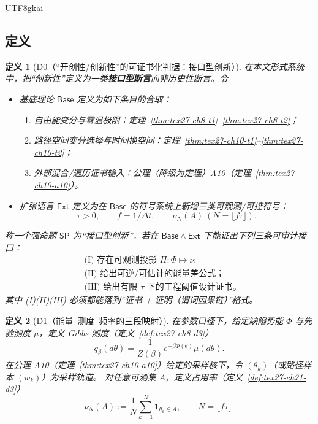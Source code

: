 \documentclass[12pt]{article}
\newtheorem{definition}{定义}[section]
\newcommand{\indicator}[1]{\mathbf{1}_{#1}}
\begin{document}
\begin{CJK*}{UTF8}{gkai}
\subsection{定义}
\label{subsec:tex27-ch22-defs}

\begin{definition}[D0（“开创性/创新性”的可证书化判据：接口型创新）]
\label{def:tex27-ch22-d0}
在本文形式系统中，把“创新性”定义为一类\textbf{接口型断言}而非历史性断言。令
\begin{itemize}
  \item 基底理论 $\mathsf{Base}$ 定义为如下条目的合取：
  \begin{enumerate}
    \item 自由能变分与零温极限：定理~\ref{thm:tex27-ch8-t1}--\ref{thm:tex27-ch8-t2}；
    \item 路径空间变分选择与时间换空间：定理~\ref{thm:tex27-ch10-t1}--\ref{thm:tex27-ch10-t2}；
    \item 外部混合/遍历证书输入：公理（降级为定理）A10（定理~\ref{thm:tex27-ch10-a10}）。
  \end{enumerate}
  \item 扩张语言 $\mathsf{Ext}$ 定义为在 $\mathsf{Base}$ 的符号系统上新增三类可观测/可控符号：
  \[
    \tau>0,\qquad f=1/\Delta t,\qquad \nu_{N}(A)\ (N=\lfloor f\tau\rfloor).
  \]
\end{itemize}
称一个强命题 $\mathsf{SP}$ 为“接口型创新”，若在 $\mathsf{Base}\wedge\mathsf{Ext}$ 下能证出下列三条可审计接口：
\[
  \boxed{
  \begin{aligned}
    &\text{(I) 存在可观测投影 } \Pi:\Phi\mapsto \nu;\\
    &\text{(II) 给出可逆/可估计的能量差公式；}\\
    &\text{(III) 给出有限 }\tau\text{ 下的工程阈值设计证书。}
  \end{aligned}
  }
\]
其中 (I)(II)(III) 必须都能落到“证书 + 证明（谓词因果链）”格式。
\end{definition}

\begin{definition}[D1（能量--测度--频率的三段映射）]
\label{def:tex27-ch22-d1}
在参数口径下，给定缺陷势能 $\Phi$ 与先验测度 $\mu$，定义 Gibbs 测度（定义~\ref{def:tex27-ch8-d3}）
\[
  q_\beta(d\theta)=\frac{1}{Z(\beta)}e^{-\beta\Phi(\theta)}\mu(d\theta).
\]
在公理 A10（定理~\ref{thm:tex27-ch10-a10}）给定的采样核下，令 $(\theta_k)$（或路径样本 $(w_k)$）为采样轨道。
对任意可测集 $A$，定义占用率（定义~\ref{def:tex27-ch21-d3}）
\[
  \nu_N(A):=\frac{1}{N}\sum_{k=1}^{N}\indicator{\theta_k\in A},
  \qquad
  N=\lfloor f\tau\rfloor.
\]
\end{definition}


\end{CJK*}
\end{document}
